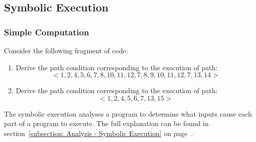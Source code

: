 \subsection{Symbolic Execution}

\subsubsection{Simple Computation}

\descriptionproblem
Consider the following fragment of code:


\questionproblem
\begin{enumerate}
    \item Derive the path condition corresponding to the execution of path:
    \begin{equation*}
        < 1, 2, 4, 5, 6, 7, 8, 10, 11, 12, 7, 8, 9, 10, 11, 12, 7, 13, 14 >
    \end{equation*}
    
    \item Derive the path condition corresponding to the execution of path:
    \begin{equation*}
        < 1, 2, 4, 5, 6, 7, 13, 15 >
    \end{equation*}
\end{enumerate}

\solution
The symbolic execution analyses a program to determine what inputs cause each part of a program to execute. The full explanation can be found in section~\ref{subsection: Analysis - Symbolic Execution} on page~\pageref{subsection: Analysis - Symbolic Execution}.


